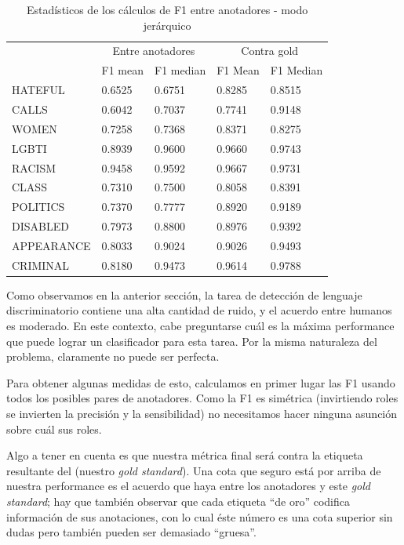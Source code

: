 \begin{table}
    \centering
    \begin{tabular}{lll|ll}
        \hline
                   & \multicolumn{2}{c}{Entre anotadores} & \multicolumn{2}{c}{Contra gold} \\
        {}         &  F1 mean&  F1 median  & F1 Mean  &  F1 Median \\
        \hline
        HATEFUL    &  0.6525 &   0.6751    & 0.8285   &   0.8515   \\
        CALLS      &  0.6042 &   0.7037    & 0.7741   &   0.9148   \\
        WOMEN      &  0.7258 &   0.7368    & 0.8371   &   0.8275   \\
        LGBTI      &  0.8939 &   0.9600    & 0.9660   &   0.9743   \\
        RACISM     &  0.9458 &   0.9592    & 0.9667   &   0.9731   \\
        CLASS      &  0.7310 &   0.7500    & 0.8058   &   0.8391   \\
        POLITICS   &  0.7370 &   0.7777    & 0.8920   &   0.9189   \\
        DISABLED   &  0.7973 &   0.8800    & 0.8976   &   0.9392   \\
        APPEARANCE &  0.8033 &   0.9024    & 0.9026   &   0.9493   \\
        CRIMINAL   &  0.8180 &   0.9473    & 0.9614   &   0.9788   \\
        \hline
    \end{tabular}
    \caption{Estadísticos de los cálculos de F1 entre anotadores - modo jerárquico}
    \label{tab:ia_f1_scores}
\end{table}

Como observamos en la anterior sección, la tarea de detección de lenguaje discriminatorio contiene una alta cantidad de ruido, y el acuerdo entre humanos es moderado. En este contexto, cabe preguntarse cuál es la máxima performance que puede lograr un clasificador para esta tarea. Por la misma naturaleza del problema, claramente no puede ser perfecta.

Para obtener algunas medidas de esto, calculamos en primer lugar las F1 usando todos los posibles pares de anotadores. Como la F1 es simétrica (invirtiendo roles se invierten la precisión y la sensibilidad) no necesitamos hacer ninguna asunción sobre cuál sus roles.

Algo a tener en cuenta es que nuestra métrica final será contra la etiqueta resultante del (nuestro \emph{gold standard}). Una cota que seguro está por arriba de nuestra performance es el acuerdo que haya entre los anotadores y este \emph{gold standard}; hay que también observar que cada etiqueta ``de oro'' codifica información de sus anotaciones, con lo cual éste número es una cota superior sin dudas pero también pueden ser demasiado ``gruesa''.

